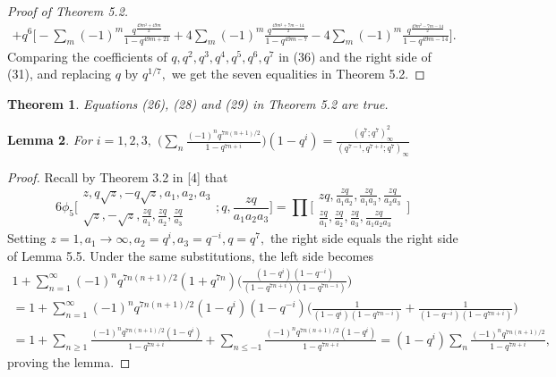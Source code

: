 \documentclass[10pt,reqno]{amsart}
\newtheorem{theorem}{Theorem}[section]
\newtheorem{lemma}[theorem]{Lemma}
\begin{document}
\begin{proof}[Proof of Theorem 5.2]
\begin{multline}
    +q^6\Bigg[-\displaystyle\sum_{m}(-1)^m\displaystyle\frac{q^{\frac{49m^2+49m}{2}}}{1-q^{49m+21}}+4\displaystyle\sum_{m}(-1)^m\displaystyle\frac{q^{\frac{49m^2+7m-14}{2}}}{1-q^{49m-7}}-4\displaystyle\sum_{m}(-1)^m\displaystyle\frac{q^{\frac{49m^2-7m-14}{2}}}{1-q^{49m-14}}\Bigg].
\end{multline}
Comparing the coefficients of $q,q^2,q^3,q^4,q^5,q^6,q^7$ in (36) and the right side of (31), and replacing $q$ by $q^{1/7},$ we get the seven equalities in Theorem 5.2.
\end{proof}
\begin{theorem}
Equations (26), (28) and (29) in Theorem 5.2 are true.
\end{theorem}
\begin{lemma}
For $i=1,2,3,$ $\Bigg(\displaystyle\sum_{n}\displaystyle\frac{(-1)^nq^{7n(n+1)/2}}{1-q^{7n+i}}\Bigg)(1-q^i)=\displaystyle\frac{(q^7;q^7)_{\infty}^2}{(q^{7-i},q^{7+i};q^7)_{\infty}}$
\end{lemma}
\begin{proof}
Recall by Theorem 3.2 in [4] that
\begin{equation*}
    6\phi_5\Bigg[\begin{array}{c}
             z, q\sqrt z,-q\sqrt z,a_1,a_2,a_3 \\
             \sqrt z,-\sqrt z,\displaystyle\frac{zq}{a_1},\displaystyle\frac{zq}{a_2},\displaystyle\frac{zq}{a_3}
    \end{array}
;q,\displaystyle\frac{zq}{a_1a_2a_3}\Bigg]=\displaystyle\prod\Bigg[\begin{array}{c}
             zq, \displaystyle\frac{zq}{a_1a_2},\displaystyle\frac{zq}{a_1a_3},\displaystyle\frac{zq}{a_2a_3} \\
             \displaystyle\frac{zq}{a_1},\displaystyle\frac{zq}{a_2},\displaystyle\frac{zq}{a_3},\displaystyle\frac{zq}{a_1a_2a_3}
    \end{array}
    \Bigg]
\end{equation*}
Setting $z=1,a_1\rightarrow\infty,a_2=q^i,a_3=q^{-i},q=q^7,$ the right side equals the right side of Lemma 5.5. Under the same substitutions, the left side becomes 
\begin{multline*}
    1+\displaystyle\sum_{n=1}^{\infty}(-1)^nq^{7n(n+1)/2}(1+q^{7n})\Bigg(\displaystyle\frac{(1-q^i)(1-q^{-i})}{(1-q^{7n+i})(1-q^{7n-i})}\Bigg)\\
    =1+\displaystyle\sum_{n=1}^{\infty}(-1)^nq^{7n(n+1)/2}(1-q^i)(1-q^{-i})\Bigg(\displaystyle\frac{1}{(1-q^i)(1-q^{7n-i})}+\displaystyle\frac{1}{(1-q^{-i})(1-q^{7n+i})}\Bigg) \\ 
    =1+\displaystyle\sum_{n\geq 1}\displaystyle\frac{(-1)^nq^{7n(n+1)/2}(1-q^i)}{1-q^{7n+i}}+\displaystyle\sum_{n\leq -1}\displaystyle\frac{(-1)^nq^{7n(n+1)/2}(1-q^i)}{1-q^{7n+i}}=(1-q^i)\displaystyle\sum_{n}\displaystyle\frac{(-1)^nq^{7n(n+1)/2}}{1-q^{7n+i}},
\end{multline*}
proving the lemma.
\end{proof}
\end{document}
